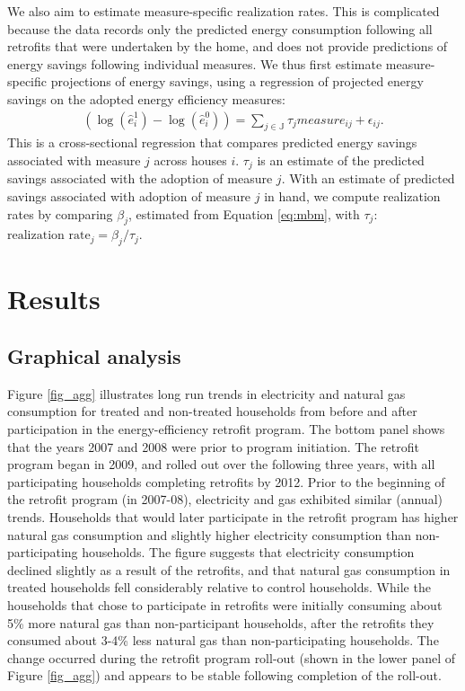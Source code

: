 \documentclass{article}
\begin{document}
We also aim to estimate measure-specific realization rates. This is complicated because the data records only the predicted energy consumption following all retrofits that were undertaken by the home, and does not provide predictions of energy savings following individual measures. We thus first estimate measure-specific projections of energy savings, using a regression of projected energy savings on the adopted energy efficiency measures:
\begin{align}
	\left(\log(\hat{e}^1_i) - \log(\hat{e}^0_i) \right) = \sum_{j \in \mathbb{J}}\tau_j measure_{ij} + \epsilon_{ij}.
	\label{eq:proj_mbm}
\end{align}
This is a cross-sectional regression that compares predicted energy savings associated with measure $j$ across houses $i$. $\tau_j$ is an estimate of the predicted savings associated with the adoption of measure $j$. With an estimate of predicted savings associated with adoption of measure $j$ in hand, we compute realization rates by comparing $\beta_j$, estimated from Equation \eqref{eq:mbm}, with $\tau_j$: $\text{realization rate}_j=\beta_j / \tau_j$.


\section{Results}

\subsection{Graphical analysis}
Figure \ref{fig_agg} illustrates long run trends in electricity and natural gas consumption for treated and non-treated households from before and after participation in the energy-efficiency retrofit program. The bottom panel shows that the years 2007 and 2008 were prior to program initiation. The retrofit program began in 2009, and rolled out over the following three years, with all participating households completing retrofits by 2012. Prior to the beginning of the retrofit program (in 2007-08), electricity and gas exhibited similar (annual) trends. Households that would later participate in the retrofit program has higher natural gas consumption and slightly higher electricity consumption than non-participating households. The figure suggests that electricity consumption declined slightly as a result of the retrofits, and that natural gas consumption in treated households fell considerably relative to control households. While the households that chose to participate in retrofits were initially consuming about 5\% more natural gas than non-participant households, after the retrofits they consumed about 3-4\% less natural gas than non-participating households. The change occurred during the retrofit program roll-out (shown in the lower panel of Figure \ref{fig_agg}) and appears to be stable following completion of the roll-out.
\end{document}
